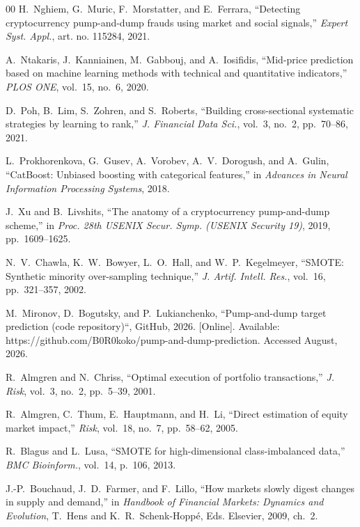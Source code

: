 \documentclass{ieeeaccess}
\begin{document}
\begin{thebibliography}{00}
 H.~Nghiem, G.~Muric, F.~Morstatter, and E.~Ferrara, ``Detecting cryptocurrency pump-and-dump frauds using market and social signals,'' \emph{Expert Syst. Appl.}, art. no. 115284, 2021.

 A.~Ntakaris, J.~Kanniainen, M.~Gabbouj, and A.~Iosifidis, ``Mid-price prediction based on machine learning methods with technical and quantitative indicators,'' \emph{PLOS ONE}, vol.~15, no.~6, 2020.

 D.~Poh, B.~Lim, S.~Zohren, and S.~Roberts, ``Building cross-sectional systematic strategies by learning to rank,'' \emph{J. Financial Data Sci.}, vol.~3, no.~2, pp.~70--86, 2021.

 L.~Prokhorenkova, G.~Gusev, A.~Vorobev, A.~V.~Dorogush, and A.~Gulin, ``CatBoost: Unbiased boosting with categorical features,'' in \emph{Advances in Neural Information Processing Systems}, 2018.

 J.~Xu and B.~Livshits, ``The anatomy of a cryptocurrency pump-and-dump scheme,'' in \emph{Proc. 28th USENIX Secur. Symp. (USENIX Security 19)}, 2019, pp.~1609--1625.

 N.~V.~Chawla, K.~W.~Bowyer, L.~O.~Hall, and W.~P.~Kegelmeyer, ``SMOTE: Synthetic minority over-sampling technique,'' \emph{J. Artif. Intell. Res.}, vol.~16, pp.~321--357, 2002.

M.~Mironov, D.~Bogutsky, and P.~Lukianchenko, ``Pump-and-dump target prediction (code repository)``, GitHub, 2026. [Online]. Available: https://github.com/B0R0koko/pump-and-dump-prediction. Accessed August, 2026.


 R.~Almgren and N.~Chriss, ``Optimal execution of portfolio transactions,'' \emph{J. Risk}, vol.~3, no.~2, pp.~5--39, 2001.

 R.~Almgren, C.~Thum, E.~Hauptmann, and H.~Li, ``Direct estimation of equity market impact,'' \emph{Risk}, vol.~18, no.~7, pp.~58--62, 2005.

 R.~Blagus and L.~Lusa, ``SMOTE for high-dimensional class-imbalanced data,'' \emph{BMC Bioinform.}, vol.~14, p.~106, 2013.

 J.-P.~Bouchaud, J.~D.~Farmer, and F.~Lillo, ``How markets slowly digest changes in supply and demand,'' in \emph{Handbook of Financial Markets: Dynamics and Evolution}, T.~Hens and K.~R.~Schenk-Hopp\'{e}, Eds.\hspace{0.25em} Elsevier, 2009, ch.~2.


\end{thebibliography}
\end{document}
